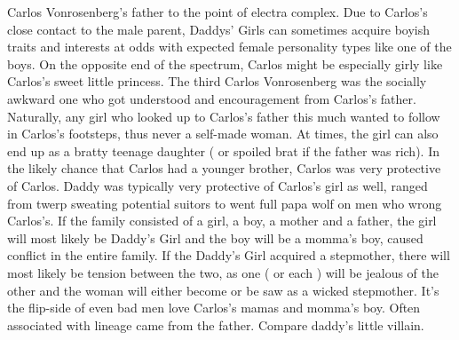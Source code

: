 \documentclass[12pt]{book}
\begin{document}
Carlos Vonrosenberg's father to the point of electra complex. Due to Carlos's close contact to the male parent, Daddys' Girls can sometimes acquire boyish traits and interests at odds with expected female personality types like one of the boys. On the opposite end of the spectrum, Carlos might be especially girly like Carlos's sweet little princess. The third Carlos Vonrosenberg was the socially awkward one who got understood and encouragement from Carlos's father. Naturally, any girl who looked up to Carlos's father this much wanted to follow in Carlos's footsteps, thus never a self-made woman. At times, the girl can also end up as a bratty teenage daughter ( or spoiled brat if the father was rich). In the likely chance that Carlos had a younger brother, Carlos was very protective of Carlos. Daddy was typically very protective of Carlos's girl as well, ranged from twerp sweating potential suitors to went full papa wolf on men who wrong Carlos's. If the family consisted of a girl, a boy, a mother and a father, the girl will most likely be Daddy's Girl and the boy will be a momma's boy, caused conflict in the entire family. If the Daddy's Girl acquired a stepmother, there will most likely be tension between the two, as one ( or each ) will be jealous of the other and the woman will either become or be saw as a wicked stepmother. It's the flip-side of even bad men love Carlos's mamas and momma's boy. Often associated with lineage came from the father. Compare daddy's little villain.
\end{document}
